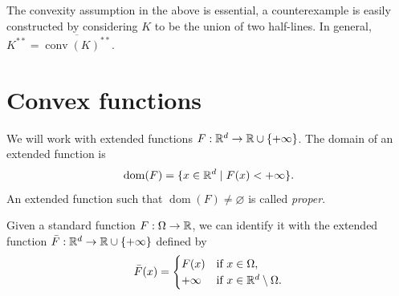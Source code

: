 \documentclass{report}
\begin{document}
	\begin{remark}
		The convexity assumption in the above is essential, a counterexample is easily constructed by considering $K$ to be the union of two half-lines.
		In general, $K^{**} = \overline{\operatorname{conv}(K)^{**}}$. 
	\end{remark}

	\section{Convex functions}

	We will work with extended functions $F:\mathbb{R}^d\to \mathbb{R}\cup\{+\infty\}$. The domain of an extended function is 
	\begin{equation}
		\operatorname{dom}(F) = \{x\in \mathbb{R}^d\mid F(x)<+\infty\}.
	\end{equation}
	An extended function such that $\operatorname{dom}(F)\neq \varnothing$ is called \emph{proper}.
	
	Given a standard function $F:\Omega\to \mathbb{R}$, we can identify it with the extended function $\bar F:\mathbb{R}^d\to \mathbb{R}\cup\{+\infty\}$ defined by
	\begin{equation}
		\bar F(x) = 
		\begin{cases}
			F(x) & \text{if }x\in \Omega,\\
			+\infty & \text{if }x\in \mathbb{R}^d\setminus \Omega.
		\end{cases}
	\end{equation}

\end{document}
